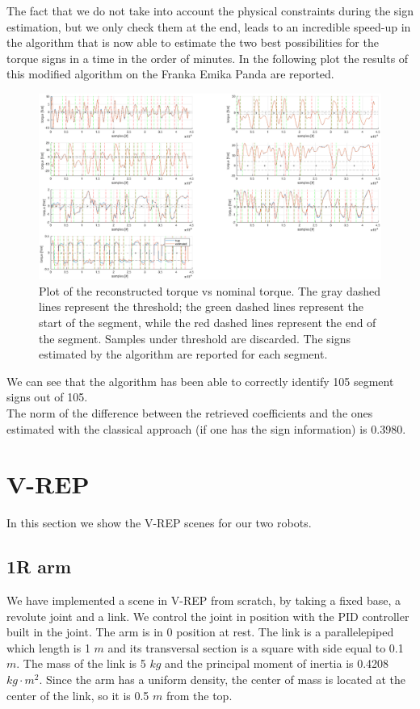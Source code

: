 \documentclass{article}
\begin{document}
The fact that we do not take into account the physical constraints during the sign estimation, but we only check them at the end, leads to an incredible speed-up in the algorithm that is now able to estimate the two best possibilities for the torque signs in a time in the order of minutes.
In the following plot the results of this modified algorithm on the Franka Emika Panda are reported.
\FloatBarrier
\begin{figure}
\centering
\includegraphics[width=1\textwidth]{images/franka_result_crop.eps}
\caption{Plot of the reconstructed torque vs nominal torque. The gray dashed lines represent the threshold; the green dashed lines represent the start of the segment, while the red dashed lines represent the end of the segment. Samples under threshold are discarded. The signs estimated by the algorithm are reported for each segment.}
\end{figure}
\FloatBarrier

We can see that the algorithm has been able to correctly identify 105 segment signs out of 105.\\
The norm of the difference between the retrieved coefficients and the ones estimated with the classical approach (if one has the sign information) is 0.3980.

\section{V-REP}
In this section we show the V-REP scenes for our two robots.

\subsection{1R arm}We have implemented a scene in V-REP from scratch, by taking a fixed base, a revolute joint and a link. We control the joint in position with the PID controller built in the joint. The arm is in 0 position at rest. The link is a parallelepiped which length is 1 $m$ and its transversal section is a square with side equal to 0.1 $m$. The mass of the link is 5 $kg$ and the principal moment of inertia is 0.4208 $kg\cdot m^2$. Since the arm has a uniform density, the center of mass is located at the center of the link, so it is 0.5 $m$ from the top.
\end{document}
